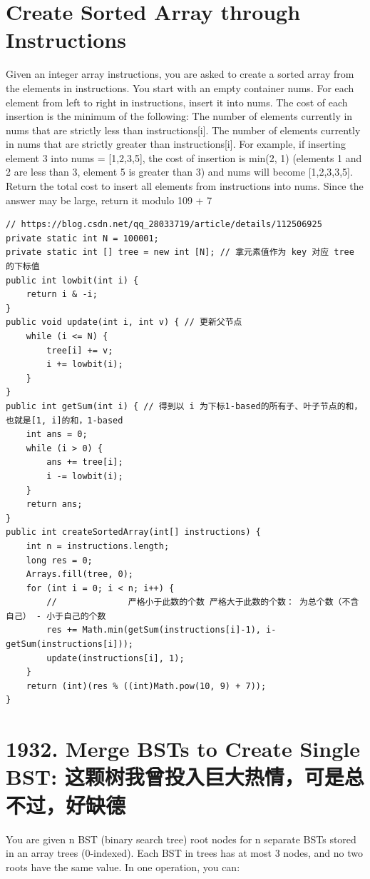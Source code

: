 \documentclass[9pt, b5paaper]{book}
\begin{document}
\section{Create Sorted Array through Instructions}
\label{sec-8-3}
Given an integer array instructions, you are asked to create a sorted array from the elements in instructions. You start with an empty container nums. For each element from left to right in instructions, insert it into nums. The cost of each insertion is the minimum of the following:
The number of elements currently in nums that are strictly less than instructions[i].
The number of elements currently in nums that are strictly greater than instructions[i].
For example, if inserting element 3 into nums = [1,2,3,5], the cost of insertion is min(2, 1) (elements 1 and 2 are less than 3, element 5 is greater than 3) and nums will become [1,2,3,3,5].
Return the total cost to insert all elements from instructions into nums. Since the answer may be large, return it modulo 109 + 7
\begin{verbatim}
// https://blog.csdn.net/qq_28033719/article/details/112506925
private static int N = 100001;
private static int [] tree = new int [N]; // 拿元素值作为 key 对应 tree 的下标值
public int lowbit(int i) {
    return i & -i;
}
public void update(int i, int v) { // 更新父节点
    while (i <= N) {
        tree[i] += v;
        i += lowbit(i);
    }
}
public int getSum(int i) { // 得到以 i 为下标1-based的所有子、叶子节点的和， 也就是[1, i]的和，1-based
    int ans = 0;
    while (i > 0) {
        ans += tree[i];
        i -= lowbit(i);
    }
    return ans;
}
public int createSortedArray(int[] instructions) {
    int n = instructions.length;
    long res = 0;
    Arrays.fill(tree, 0);
    for (int i = 0; i < n; i++) {
        //              严格小于此数的个数 严格大于此数的个数： 为总个数（不含自己） - 小于自己的个数
        res += Math.min(getSum(instructions[i]-1), i-getSum(instructions[i])); 
        update(instructions[i], 1);
    }
    return (int)(res % ((int)Math.pow(10, 9) + 7));
}
\end{verbatim}

\section{1932. Merge BSTs to Create Single BST: 这颗树我曾投入巨大热情，可是总不过，好缺德}
\label{sec-8-4}
You are given n BST (binary search tree) root nodes for n separate BSTs stored in an array trees (0-indexed). Each BST in trees has at most 3 nodes, and no two roots have the same value. In one operation, you can:
\end{document}
